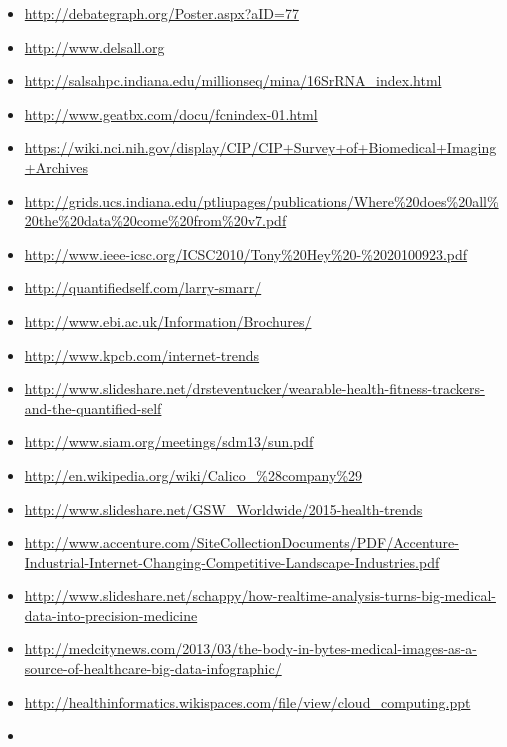 \begin{itemize}
\begin{comment}
\item
  \url{http://www.liveathos.com/apparel/app}
\end{comment}
\item
  \url{http://debategraph.org/Poster.aspx?aID=77}
\begin{comment}
\item
  \url{http://www.oerc.ox.ac.uk/downloads/presentations-from-events/microsoftworkshop/gannon}
\end{comment}
\item
  \url{http://www.delsall.org}
\item
  \url{http://salsahpc.indiana.edu/millionseq/mina/16SrRNA_index.html}
\item
  \url{http://www.geatbx.com/docu/fcnindex-01.html}
\item
  \url{https://wiki.nci.nih.gov/display/CIP/CIP+Survey+of+Biomedical+Imaging+Archives}
\item
  \url{http://grids.ucs.indiana.edu/ptliupages/publications/Where\%20does\%20all\%20the\%20data\%20come\%20from\%20v7.pdf}
\item
  \url{http://www.ieee-icsc.org/ICSC2010/Tony\%20Hey\%20-\%2020100923.pdf}
\item
  \url{http://quantifiedself.com/larry-smarr/}
\item
  \url{http://www.ebi.ac.uk/Information/Brochures/}
\item
  \url{http://www.kpcb.com/internet-trends}
\item
  \url{http://www.slideshare.net/drsteventucker/wearable-health-fitness-trackers-and-the-quantified-self}
\item
  \url{http://www.siam.org/meetings/sdm13/sun.pdf}
\item
  \url{http://en.wikipedia.org/wiki/Calico_\%28company\%29}
\item
  \url{http://www.slideshare.net/GSW_Worldwide/2015-health-trends}
\item
  \url{http://www.accenture.com/SiteCollectionDocuments/PDF/Accenture-Industrial-Internet-Changing-Competitive-Landscape-Industries.pdf}
\item
  \url{http://www.slideshare.net/schappy/how-realtime-analysis-turns-big-medical-data-into-precision-medicine}
\item
  \url{http://medcitynews.com/2013/03/the-body-in-bytes-medical-images-as-a-source-of-healthcare-big-data-infographic/}
\item
  \url{http://healthinformatics.wikispaces.com/file/view/cloud_computing.ppt}
\item

\end{itemize}
